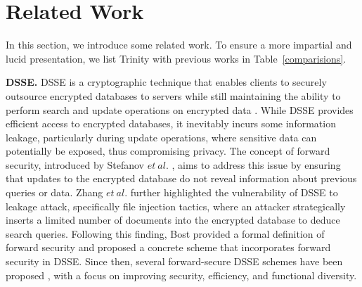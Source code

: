 \section{Related Work}
In this section, we introduce some related work. To ensure a more impartial and lucid presentation, we list Trinity with previous works in Table~\ref{comparisions}.
\par  \textbf{DSSE.} DSSE is a cryptographic technique that enables clients to securely outsource encrypted databases to servers while still maintaining the ability to perform search and update operations on encrypted data \cite{stefanov2014practical,cash2015leakage,kim2017forward, 10621113, etemad2018efficient,zuo2020forward,wang2022forward}. While DSSE provides efficient access to encrypted databases, it inevitably incurs some information leakage, particularly during update operations, where sensitive data can potentially be exposed, thus compromising privacy. The concept of forward security, introduced by Stefanov $et\ al.$ \cite{stefanov2014practical}, aims to address this issue by ensuring that updates to the encrypted database do not reveal information about previous queries or data. Zhang $et\ al.$ \cite{zhang2016all} further highlighted the vulnerability of DSSE to leakage attack, specifically file injection tactics, where an attacker strategically inserts a limited number of documents into the encrypted database to deduce search queries. Following this finding, Bost \cite{bost2016ovarphiovarsigma} provided a formal definition of forward security and proposed a concrete scheme that incorporates forward security in DSSE. Since then, several forward-secure DSSE schemes have been proposed \cite{etemad2018efficient,song2018forward,li2021towards,guo2023forward}, with a focus on improving security, efficiency, and functional diversity.




